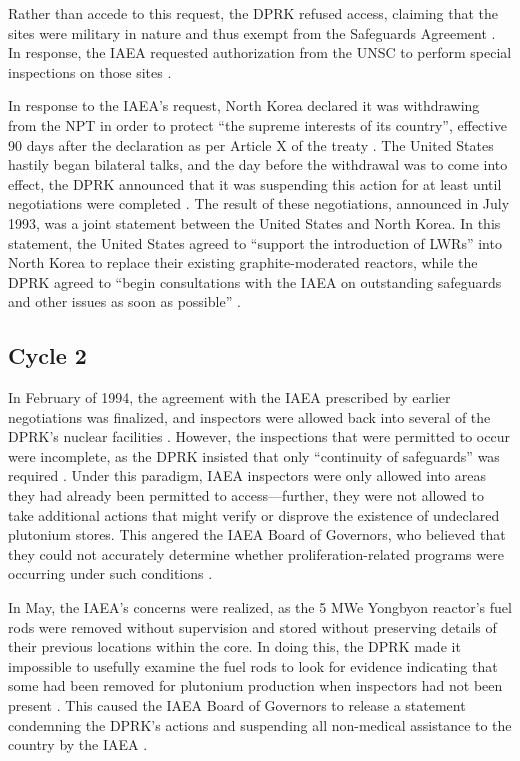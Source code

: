 Rather than accede to this request, the DPRK refused access, claiming that the sites were military in nature and thus exempt from the Safeguards Agreement \cite{nti15,iaea09}. In response, the IAEA requested authorization from the UNSC to perform special inspections on those sites \cite{nti15}.
 
In response to the IAEA's request, North Korea declared it was withdrawing from the NPT in order to protect ``the supreme interests of its country'', effective 90 days after the declaration as per Article X of the treaty \cite{npt}. The United States hastily began bilateral talks, and the day before the withdrawal was to come into effect, the DPRK announced that it was suspending this action for at least until negotiations were completed \cite{nti15}. The result of these negotiations, announced in July 1993, was a joint statement between the United States and North Korea. In this statement, the United States agreed to ``support the introduction of LWRs'' into North Korea to replace their existing graphite-moderated reactors, while the DPRK agreed to ``begin consultations with the IAEA on outstanding safeguards and other issues as soon as possible'' \cite{hayes}. 

\subsection{Cycle 2}

In February of 1994, the agreement with the IAEA prescribed by earlier negotiations was finalized, and inspectors were allowed back into several of the DPRK's nuclear facilities \cite{davenport}. However, the inspections that were permitted to occur were incomplete, as the DPRK insisted that only ``continuity of safeguards'' was required \cite{iaea09}. Under this paradigm, IAEA inspectors were only allowed into areas they had already been permitted to access---further, they were not allowed to take additional actions that might verify or disprove the existence of undeclared plutonium stores. This angered the IAEA Board of Governors, who believed that they could not accurately determine whether proliferation-related programs were occurring under such conditions \cite{davenport}.

In May, the IAEA's concerns were realized, as the 5 MWe Yongbyon reactor's fuel rods were removed without supervision and stored without preserving details of their previous locations within the core. In doing this, the DPRK made it impossible to usefully examine the fuel rods to look for evidence indicating that some had been removed for plutonium production when inspectors had not been present \cite{nobacksies}. This caused the IAEA Board of Governors to release a statement condemning the DPRK's actions and suspending all non-medical assistance to the country by the IAEA \cite{iaea94}.

